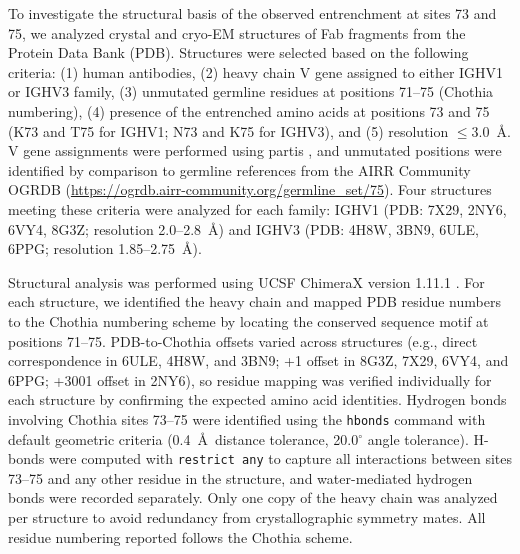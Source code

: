 To investigate the structural basis of the observed entrenchment at sites 73 and 75, we analyzed crystal and cryo-EM structures of Fab fragments from the Protein Data Bank (PDB).
Structures were selected based on the following criteria: (1) human antibodies, (2) heavy chain V gene assigned to either IGHV1 or IGHV3 family, (3) unmutated germline residues at positions 71--75 (Chothia numbering), (4) presence of the entrenched amino acids at positions 73 and 75 (K73 and T75 for IGHV1; N73 and K75 for IGHV3), and (5) resolution $\leq$3.0~\AA.
V gene assignments were performed using partis \cite{Ralph2016}, and unmutated positions were identified by comparison to germline references from the AIRR Community OGRDB (\url{https://ogrdb.airr-community.org/germline_set/75}).
Four structures meeting these criteria were analyzed for each family: IGHV1 (PDB: 7X29, 2NY6, 6VY4, 8G3Z; resolution 2.0--2.8~\AA) and IGHV3 (PDB: 4H8W, 3BN9, 6ULE, 6PPG; resolution 1.85--2.75~\AA).

Structural analysis was performed using UCSF ChimeraX version 1.11.1 \cite{Pettersen2021}.
For each structure, we identified the heavy chain and mapped PDB residue numbers to the Chothia numbering scheme by locating the conserved sequence motif at positions 71--75.
PDB-to-Chothia offsets varied across structures (e.g., direct correspondence in 6ULE, 4H8W, and 3BN9; +1 offset in 8G3Z, 7X29, 6VY4, and 6PPG; +3001 offset in 2NY6), so residue mapping was verified individually for each structure by confirming the expected amino acid identities.
Hydrogen bonds involving Chothia sites 73--75 were identified using the \texttt{hbonds} command with default geometric criteria (0.4~\AA\ distance tolerance, 20.0$^\circ$ angle tolerance).
H-bonds were computed with \texttt{restrict any} to capture all interactions between sites 73--75 and any other residue in the structure, and water-mediated hydrogen bonds were recorded separately.
Only one copy of the heavy chain was analyzed per structure to avoid redundancy from crystallographic symmetry mates.
All residue numbering reported follows the Chothia scheme.
